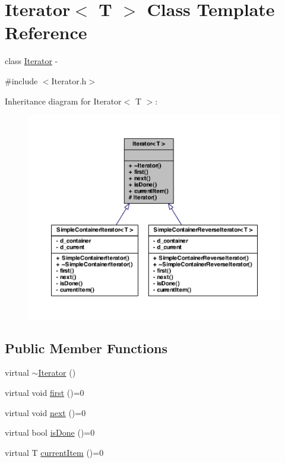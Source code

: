 \hypertarget{class_iterator}{
\section{Iterator$<$ T $>$ Class Template Reference}
\label{class_iterator}
}


class \hyperlink{class_iterator}{Iterator} -\/  




{\ttfamily \#include $<$Iterator.h$>$}



Inheritance diagram for Iterator$<$ T $>$:\nopagebreak
\begin{figure}[H]
\begin{center}
\leavevmode
\includegraphics[width=400pt]{class_iterator__inherit__graph}
\end{center}
\end{figure}
\subsection*{Public Member Functions}
\begin{DoxyCompactItemize}
\item 
virtual \hyperlink{class_iterator_a9e5aab5b020f674497ee9752ab31db8a}{$\sim$Iterator} ()
\item 
virtual void \hyperlink{class_iterator_a6f13cc79a1574086c63ce4ddba1d3d9f}{first} ()=0
\item 
virtual void \hyperlink{class_iterator_a94a7b0c50676cd9ee924eddece41d8d4}{next} ()=0
\item 
virtual bool \hyperlink{class_iterator_a8e7b414c641f4f0838ff8bd6ba954b7a}{isDone} ()=0
\item 
virtual T \hyperlink{class_iterator_a1fce5bc9b2218407b5cedf2a0ba3131b}{currentItem} ()=0
\end{DoxyCompactItemize}
